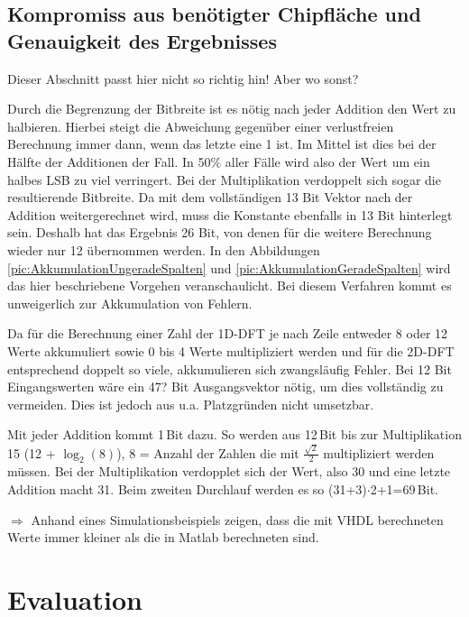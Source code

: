  
 
 \section{Kompromiss aus benötigter Chipfläche und Genauigkeit des Ergebnisses}
Dieser Abschnitt passt hier nicht so richtig hin! Aber wo sonst?

Durch die Begrenzung der Bitbreite ist es nötig nach jeder Addition den Wert zu halbieren. Hierbei steigt die Abweichung gegenüber einer verlustfreien Berechnung immer dann, 
wenn das letzte eine 1 ist. Im Mittel ist dies bei der Hälfte der Additionen der Fall. In 50$\%$ aller Fälle wird also der Wert um ein halbes LSB zu viel verringert.
Bei der Multiplikation verdoppelt sich sogar die resultierende Bitbreite. Da mit dem vollständigen 13 Bit Vektor nach der Addition weitergerechnet wird, muss die Konstante
ebenfalls in 13 Bit hinterlegt sein. Deshalb hat das Ergebnis 26 Bit, von denen für die weitere Berechnung wieder nur 12 übernommen werden. In den Abbildungen 
\ref{pic:AkkumulationUngeradeSpalten} und \ref{pic:AkkumulationGeradeSpalten} wird das hier beschriebene Vorgehen veranschaulicht. Bei diesem Verfahren
kommt es unweigerlich zur Akkumulation von Fehlern.
 
Da für die Berechnung einer Zahl der 1D-DFT je nach Zeile entweder 8 oder 12 Werte akkumuliert sowie 0 bis 4 Werte multipliziert werden und für die 2D-DFT entsprechend doppelt 
so viele, akkumulieren sich zwangsläufig Fehler. Bei 12 Bit Eingangswerten wäre ein 47? Bit Ausgangsvektor nötig, um dies vollständig zu vermeiden. Dies ist jedoch aus u.a.
Platzgründen nicht umsetzbar.

Mit jeder Addition kommt 1\,Bit dazu. So werden aus 12\,Bit bis zur Multiplikation 15 (12 + $\log_2(8)$), 8 = Anzahl der Zahlen die mit $\tfrac{\sqrt{2}}{2}$ multipliziert
werden müssen. Bei der Multiplikation verdopplet sich der Wert, also 30 und eine letzte Addition macht 31.
Beim zweiten Durchlauf werden es so (31+3)$\cdot$2+1=69\,Bit.

$\Rightarrow$ Anhand eines Simulationsbeispiels zeigen, dass die mit VHDL berechneten Werte immer kleiner als die in Matlab berechneten sind.






  
 \chapter{Evaluation}
 


